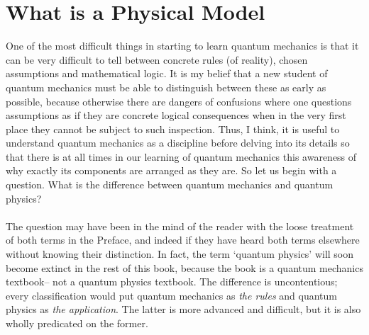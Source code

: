\section{What is a Physical Model}
One of the most difficult things in starting to learn quantum mechanics is that it can be very difficult to tell between concrete rules (of reality), chosen assumptions and mathematical logic. It is my belief that a new student of quantum mechanics must be able to distinguish between these as early as possible, because otherwise there are dangers of confusions where one questions assumptions as if they are concrete logical consequences when in the very first place they cannot be subject to such inspection. Thus, I think, it is useful to understand quantum mechanics as a discipline before delving into its details so that there is at all times in our learning of quantum mechanics this awareness of why exactly its components are arranged as they are. So let us begin with a question. What is the difference between quantum mechanics and quantum physics?
\\\\
The question may have been in the mind of the reader with the loose treatment of both terms in the Preface, and indeed if they have heard both terms elsewhere without knowing their distinction. In fact, the term `quantum physics' will soon become extinct in the rest of this book, because the book is a quantum mechanics textbook-- not a quantum physics textbook. The difference is uncontentious; every classification would put quantum mechanics as \textit{the rules} and quantum physics as \textit{the application}. The latter is more advanced and difficult, but it is also wholly predicated on the former. 
\\\\

